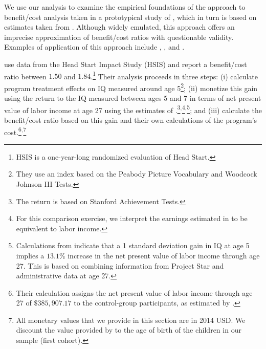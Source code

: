 We use our analysis to examine the empirical foundations of the approach to benefit/cost analysis taken in a prototypical study of \citet{Kline_Walters_2016_QJE}, which in turn is based on estimates taken from \citet{Chetty_Friedman_etal_2011_QJoE}. Although widely emulated, this approach offers an imprecise approximation of benefit/cost ratios with questionable validity. Examples of application of this approach include \citet{Attanasio_Kugler_Meghir_2011_AEJAE}, \cite{Behrman-et-al_2011_JHR-Progresa}, and \cite{Deshpande_Yue_2017_Screened_Unpublished}.

\citet{Kline_Walters_2016_QJE} use data from the Head Start Impact Study (HSIS) and report a benefit/cost ratio between $1.50$ and $1.84$.\footnote{HSIS is a one-year-long randomized evaluation of Head Start.} Their analysis proceeds in three steps: (i) calculate program treatment effects on IQ measured around age 5\footnote{They use an index based on the Peabody Picture Vocabulary and Woodcock Johnson III Tests.}; (ii) monetize this gain using the return to the IQ measured between ages 5 and 7 in terms of net present value of labor income at age 27 using the estimates of \citet{Chetty_Friedman_etal_2011_QJoE}.\footnote{The \citet{Chetty_Friedman_etal_2011_QJoE} return is based on Stanford Achievement Tests.}$^,$\footnote{For this comparison exercise, we interpret the earnings estimated in \citet{Chetty_Friedman_etal_2011_QJoE} to be equivalent to labor income.}$^,$\footnote{Calculations from \citet{Chetty_Friedman_etal_2011_QJoE} indicate that a 1 standard deviation gain in IQ at age 5 implies a $13.1\%$ increase in the net present value of labor income through age 27. This is based on combining information from Project Star and administrative data at age 27.}; and (iii) calculate the benefit/cost ratio based on this gain and their own calculations of the program's cost.\footnote{Their calculation assigns the net present value of labor income through age 27 of $\$385,907.17$ to the control-group participants, as estimated by  \citet{Chetty_Friedman_etal_2011_QJoE}.}$^,$\footnote{All monetary values that we provide in this section are in 2014 USD. We discount the value provided by \citet{Chetty_Friedman_etal_2011_QJoE} to the age of birth of the children in our sample (first cohort).}

